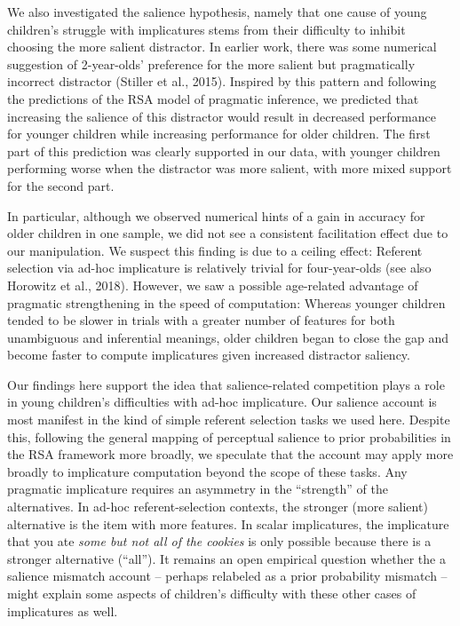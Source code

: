 \documentclass[man]{apa6}
\begin{document}
We also investigated the salience hypothesis, namely that one cause of
young children's struggle with implicatures stems from their difficulty
to inhibit choosing the more salient distractor. In earlier work, there
was some numerical suggestion of 2-year-olds' preference for the more
salient but pragmatically incorrect distractor (Stiller et al., 2015).
Inspired by this pattern and following the predictions of the RSA model
of pragmatic inference, we predicted that increasing the salience of
this distractor would result in decreased performance for younger
children while increasing performance for older children. The first part
of this prediction was clearly supported in our data, with younger
children performing worse when the distractor was more salient, with
more mixed support for the second part.

In particular, although we observed numerical hints of a gain in
accuracy for older children in one sample, we did not see a consistent
facilitation effect due to our manipulation. We suspect this finding is
due to a ceiling effect: Referent selection via ad-hoc implicature is
relatively trivial for four-year-olds (see also Horowitz et al., 2018).
However, we saw a possible age-related advantage of pragmatic
strengthening in the speed of computation: Whereas younger children
tended to be slower in trials with a greater number of features for both
unambiguous and inferential meanings, older children began to close the
gap and become faster to compute implicatures given increased distractor
saliency.

Our findings here support the idea that salience-related competition
plays a role in young children's difficulties with ad-hoc implicature.
Our salience account is most manifest in the kind of simple referent
selection tasks we used here. Despite this, following the general
mapping of perceptual salience to prior probabilities in the RSA
framework more broadly, we speculate that the account may apply more
broadly to implicature computation beyond the scope of these tasks. Any
pragmatic implicature requires an asymmetry in the \enquote{strength} of
the alternatives. In ad-hoc referent-selection contexts, the stronger
(more salient) alternative is the item with more features. In scalar
implicatures, the implicature that you ate \emph{some but not all of the
cookies} is only possible because there is a stronger alternative
(\enquote{all}). It remains an open empirical question whether the a
salience mismatch account -- perhaps relabeled as a prior probability
mismatch -- might explain some aspects of children's difficulty with
these other cases of implicatures as well.
\end{document}
